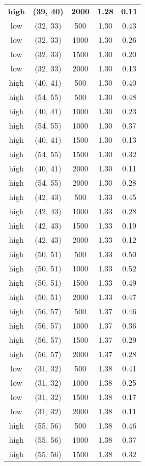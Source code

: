 \begin{tabular}{c c c c c}
\textbf{high} & \textbf{(39, 40)} & \textbf{ 2000} & \textbf{1.28} & \textbf{0.11} \\
low & (32, 33) &  500 & 1.30 & 0.43 \\
low & (32, 33) &  1000 & 1.30 & 0.26 \\
low & (32, 33) &  1500 & 1.30 & 0.20 \\
low & (32, 33) &  2000 & 1.30 & 0.13 \\
high & (40, 41) &  500 & 1.30 & 0.40 \\
high & (54, 55) &  500 & 1.30 & 0.48 \\
high & (40, 41) &  1000 & 1.30 & 0.23 \\
high & (54, 55) &  1000 & 1.30 & 0.37 \\
high & (40, 41) &  1500 & 1.30 & 0.13 \\
high & (54, 55) &  1500 & 1.30 & 0.32 \\
high & (40, 41) &  2000 & 1.30 & 0.11 \\
high & (54, 55) &  2000 & 1.30 & 0.28 \\
high & (42, 43) &  500 & 1.33 & 0.45 \\
high & (42, 43) &  1000 & 1.33 & 0.28 \\
high & (42, 43) &  1500 & 1.33 & 0.19 \\
high & (42, 43) &  2000 & 1.33 & 0.12 \\
high & (50, 51) &  500 & 1.33 & 0.50 \\
high & (50, 51) &  1000 & 1.33 & 0.52 \\
high & (50, 51) &  1500 & 1.33 & 0.49 \\
high & (50, 51) &  2000 & 1.33 & 0.47 \\
high & (56, 57) &  500 & 1.37 & 0.46 \\
high & (56, 57) &  1000 & 1.37 & 0.36 \\
high & (56, 57) &  1500 & 1.37 & 0.29 \\
high & (56, 57) &  2000 & 1.37 & 0.28 \\
low & (31, 32) &  500 & 1.38 & 0.41 \\
low & (31, 32) &  1000 & 1.38 & 0.25 \\
low & (31, 32) &  1500 & 1.38 & 0.17 \\
low & (31, 32) &  2000 & 1.38 & 0.11 \\
high & (55, 56) &  500 & 1.38 & 0.46 \\
high & (55, 56) &  1000 & 1.38 & 0.37 \\
high & (55, 56) &  1500 & 1.38 & 0.32 \\

\end{tabular}
